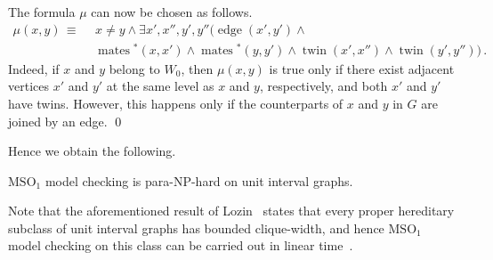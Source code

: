 \documentclass{CSML}
\def\prebox#1{\mathop{\mbox{#1}}}
\newcommand{\MSOi}{\ensuremath{\operatorname{MSO_1}}\xspace}
\theoremstyle{plain}\newtheorem{claim}[thm]{Claim}
\begin{document}
The formula $\mu$ can now be chosen as follows.
\begin{align*}
\mu(x,y)\,\equiv~&\> x\not=y\wedge
	\exists x',x'',y',y'' \big( \prebox{edge}(x',y')\wedge
\\
	&\, \prebox{mates}{}^*(x,x')\wedge\prebox{mates}{}^*(y,y')\wedge
		\prebox{twin}(x',x'')\wedge\prebox{twin}(y',y'') \big)
\,.\end{align*}
Indeed, if $x$ and $y$ belong to $W_0$,
then $\mu(x,y)$ is true only if there exist adjacent vertices $x'$ and $y'$ at the same level as $x$ and $y$, respectively, and
both $x'$ and $y'$ have twins.
However, this happens only if the counterparts of $x$ and $y$ in $G$ are joined by an edge.
\qed

Hence we obtain the following.
\begin{cor}
\label{cor-MSO}
\MSOi model checking is para-\textup{NP}-hard on unit interval graphs.
\end{cor}
Note that the aforementioned result of Lozin~\cite{loz08} states that
every proper hereditary subclass of unit interval graphs has bounded clique-width,
and hence \MSOi model checking on this class can be carried out in linear time~\cite{cmr00}.




\end{document}
